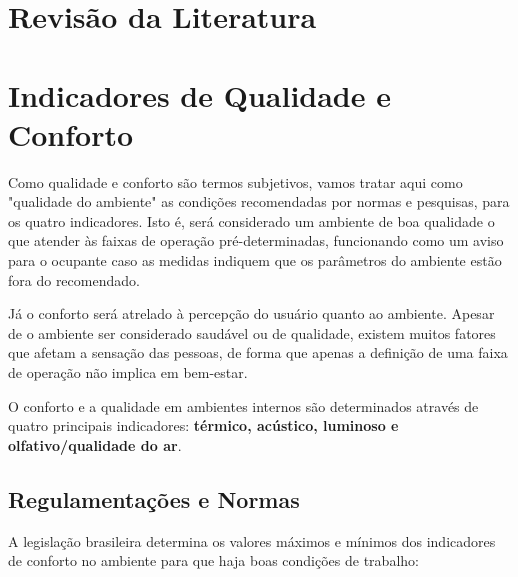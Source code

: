 \documentclass[../monografia.tex]{subfiles}
\begin{document}
\section{Revisão da Literatura} 

\section{Indicadores de Qualidade e Conforto} \label{arte-indicadores}


Como qualidade e conforto são termos subjetivos, vamos tratar aqui como "qualidade do ambiente" as condições recomendadas por normas e pesquisas, para os quatro indicadores. Isto é, será considerado um ambiente de boa qualidade o que atender às faixas de operação pré-determinadas, funcionando como um aviso para o ocupante caso as medidas indiquem que os parâmetros do ambiente estão fora do recomendado. 

Já o conforto será atrelado à percepção do usuário quanto ao ambiente. Apesar de o ambiente ser considerado saudável ou de qualidade, existem muitos fatores que afetam a sensação das pessoas, de forma que apenas a definição de uma faixa de operação não implica em bem-estar. 

O conforto e a qualidade em ambientes internos são determinados através de quatro principais indicadores: \textbf{térmico, acústico, luminoso e olfativo/qualidade do ar}\cite{ComfortBox}. 

\subsection{Regulamentações e Normas} %

A legislação brasileira determina os valores máximos e mínimos dos indicadores de conforto no ambiente para que haja boas condições de trabalho: 
\end{document}
